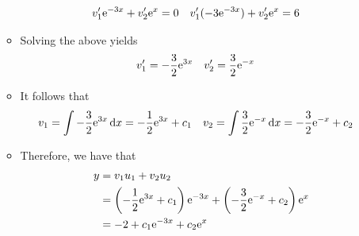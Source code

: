 \documentclass[../main.tex]{subfiles}
\begin{document}
\begin{itemize}
\begin{itemize}
        \begin{align*}
            v_1'\e[-3x]+v_2'\e[x] &= 0&
            v_1'(-3\e[-3x])+v_2'\e[x] &= 6
        \end{align*}
        \item Solving the above yields
        \begin{align*}
            v_1' &= -\frac{3}{2}\e[3x]&
            v_2' &= \frac{3}{2}\e[-x]
        \end{align*}
        \item It follows that
        \begin{align*}
            v_1 &= \int-\frac{3}{2}\e[3x]\dd{x} = -\frac{1}{2}\e[3x]+c_1&
            v_2 &= \int\frac{3}{2}\e[-x]\dd{x} = -\frac{3}{2}\e[-x]+c_2
        \end{align*}
        \item Therefore, we have that
        \begin{align*}
            y &= v_1u_1+v_2u_2\\
            &= \left( -\frac{1}{2}\e[3x]+c_1 \right)\e[-3x]+\left( -\frac{3}{2}\e[-x]+c_2 \right)\e[x]\\
            &= -2+c_1\e[-3x]+c_2\e[x]
        \end{align*}
    \end{itemize}
\end{itemize}
\end{document}
